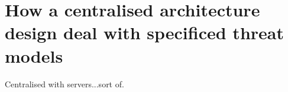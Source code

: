 \section{How a centralised architecture design deal with specificed threat models}
Centralised with servers...sort of.
